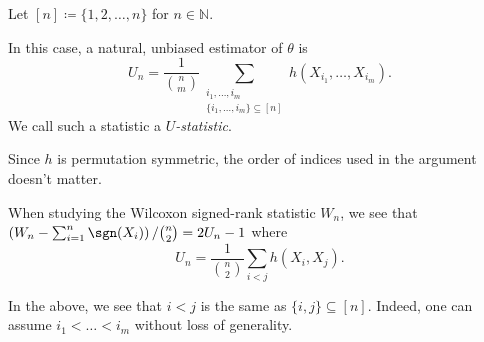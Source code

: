 \begin{notation}
	Let \([n] \coloneqq \{ 1, 2, \dots , n \} \) for \(n \in \mathbb{N} \).
\end{notation}

In this case, a natural, unbiased estimator of \(\theta \) is
\[
	U_n
	= \frac{1}{\binom{n}{m}} \sum_{\substack{i_1, \dots , i_m \\ \{ i_1, \dots , i_m \} \subseteq [n] }} h(X_{i_1}, \dots , X_{i_m}).
\]
We call such a statistic a \emph{\(U\)-statistic}.

\begin{note}
	Since \(h\) is permutation symmetric, the order of indices used in the argument doesn't matter.
\end{note}

\begin{eg}
	When studying the Wilcoxon signed-rank statistic \(W_n\), we see that \(\left( W_n - \sum_{i=1}^{n} \sgn (X_i) \right) / \binom{n}{2} = 2U_n - 1\) where
	\[
		U_n = \frac{1}{\binom{n}{2}} \sum_{i < j} h(X_i, X_j).
	\]
\end{eg}

\begin{note}
	In the above, we see that \(i < j\) is the same as \(\{ i, j \} \subseteq [n] \). Indeed, one can assume \(i_1 < \dots < i_m\) without loss of generality.
\end{note}



